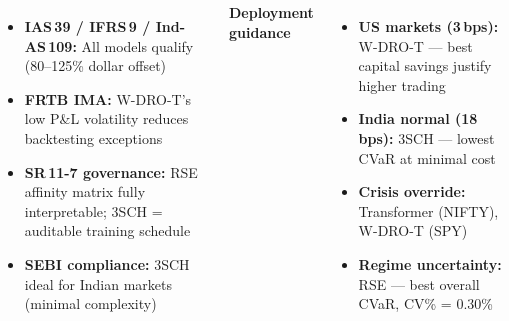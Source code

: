\documentclass[25pt, a0paper, portrait]{tikzposter}
\begin{document}
\begin{columns}
{\medskip
\begin{itemize}[leftmargin=1em,itemsep=2pt,labelsep=0.3em,topsep=2pt]
\item[\textcolor{GreenOK}{\ding{51}}] \textbf{IAS\,39 / IFRS\,9 /
  Ind-AS\,109:} All models qualify (80--125\% dollar offset)
\item[\textcolor{GreenOK}{\ding{51}}] \textbf{FRTB IMA:} W-DRO-T's low P\&L
  volatility reduces backtesting exceptions
\item[\textcolor{GreenOK}{\ding{51}}] \textbf{SR\,11-7 governance:}
  RSE affinity matrix fully interpretable;
  3SCH = auditable training schedule
\item[\textcolor{GreenOK}{\ding{51}}] \textbf{SEBI compliance:}
  3SCH ideal for Indian markets (minimal complexity)
\end{itemize}

\bigskip
\textbf{\color{NavyPri}Deployment guidance}
\begin{itemize}[leftmargin=1em,itemsep=2pt,labelsep=0.3em,topsep=2pt]
\item[$\triangleright$] \textbf{US markets (3\,bps):} W-DRO-T
  --- best capital savings justify higher trading
\item[$\triangleright$] \textbf{India normal (18\,bps):} 3SCH
  --- lowest CVaR at minimal cost
\item[$\triangleright$] \textbf{Crisis override:} Transformer (NIFTY),
  W-DRO-T (SPY)
\item[$\triangleright$] \textbf{Regime uncertainty:} RSE
  --- best overall CVaR, CV\% = 0.30\%
\end{itemize}
}

\end{columns}
\end{document}
